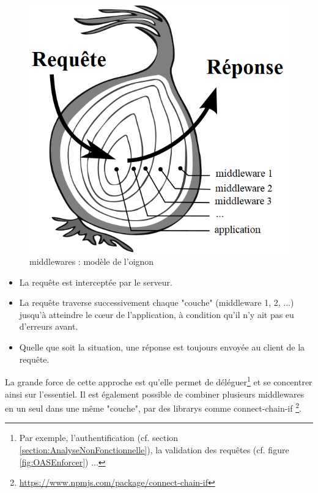 \begin{figure}[H]
    \includegraphics[width=\textwidth,height=0.25\textheight,keepaspectratio]{images/serveur/middleware_onion.png}
    \centering
    \caption{\Glspl{middleware} : modèle de l'oignon}
    \label{fig:middlewareOnion}
\end{figure}

\begin{itemize}[nosep,noitemsep,topsep=0pt,partopsep=0pt,after=\vspace*{2pt}]
    \item La requête est interceptée par le serveur.
    \item La requête traverse successivement chaque "couche" (\gls{middleware} 1, 2, ...) jusqu'à atteindre le cœur de l'application, 
    à condition qu'il n'y ait pas eu d'erreurs avant.
    \item Quelle que soit la situation, une réponse est toujours envoyée au client de la requête.
\end{itemize}

La grande force de cette approche est qu'elle permet de déléguer\footnote{
    Par exemple, l'authentification (cf. section \ref{section:AnalyseNonFonctionnelle}), la validation des requêtes (cf. figure \ref{fig:OASEnforcer}) ...
} et se concentrer ainsi sur l'essentiel. Il est également possible de combiner plusieurs \glspl{middleware} en un seul dans une même "couche", par des \glspl{library} comme connect-chain-if
\footnote{
    \url{https://www.npmjs.com/package/connect-chain-if}
}.

